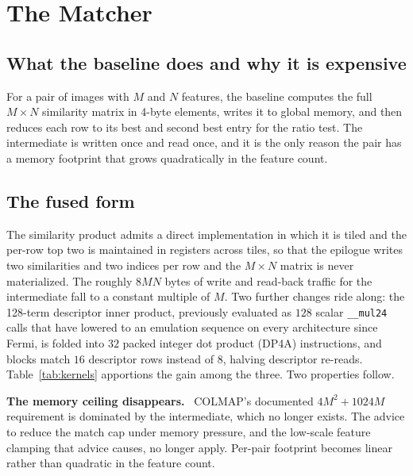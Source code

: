 \documentclass[conference]{IEEEtran}
\newcommand{\para}[1]{\smallskip\noindent\textbf{#1}\ }
\newcommand{\opt}[1]{\texttt{#1}}
\begin{document}
\section{The Matcher}
\label{sec:matcher}

\subsection{What the baseline does and why it is expensive}

For a pair of images with $M$ and $N$ features, the baseline computes the full
$M \times N$ similarity matrix in 4-byte elements, writes it to global memory,
and then reduces each row to its best and second best entry for the ratio test.
The intermediate is written once and read once, and it is the only reason the
pair has a memory footprint that grows quadratically in the feature count.

\subsection{The fused form}

The similarity product admits a direct implementation in which it is tiled and
the per-row top two is maintained in registers across tiles, so that the epilogue
writes two similarities and two indices per row and the $M \times N$ matrix is
never materialized. The roughly $8MN$ bytes of write and read-back traffic for
the intermediate fall to a constant multiple of $M$. Two further changes ride
along: the 128-term descriptor inner product, previously evaluated as $128$
scalar \opt{\_\_mul24} calls that have lowered to an emulation sequence on
every architecture since Fermi, is folded into $32$ packed integer dot product
(DP4A) instructions, and blocks match $16$ descriptor rows instead of $8$,
halving descriptor re-reads. Table~\ref{tab:kernels} apportions the gain among
the three. Two properties follow.

\para{The memory ceiling disappears.} COLMAP's documented $4M^2 + 1024M$
requirement is dominated by the intermediate, which no longer exists. The advice
to reduce the match cap under memory pressure, and the low-scale feature
clamping that advice causes, no longer apply. Per-pair footprint becomes linear
rather than quadratic in the feature count.
\end{document}
